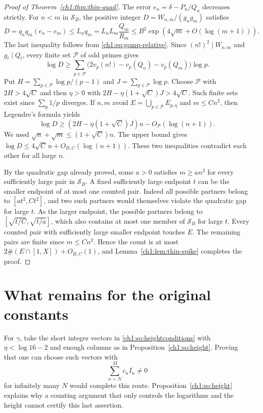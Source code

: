 \documentclass[11pt,a4paper,oneside,openany]{report}
\theoremstyle{remark}\newtheorem{remark}[theorem]{Remark}
\numberwithin{equation}{section}
\begin{document}
\begin{proof}[Proof of Theorem~\ref{ch1:thm:thin-quad}]
The error $e_n=\delta-P_n/Q_n$ decreases strictly. For $n<m$ in
$\mathcal S_B$, the positive integer
$D=W_{n,m}/(g_ng_m)$ satisfies
\[
 D=q_nq_m(e_n-e_m)\le L_n q_m
       = L_n L_m\frac{Q_m}{R_m}
       \le B^2\exp(4\sqrt m+O(\log(m+1))).
\]
The last inequality follows from \eqref{ch1:eq:gomp-relative}. Since $(n!)^2\mid W_{n,m}$
and $g_t\mid Q_t$, every finite set $\mathcal P$ of odd primes gives
\[
 \log D\ge
 \sum_{p\in\mathcal P}
    \big(2v_p(n!)-v_p(Q_n)-v_p(Q_m)\big)\log p .
\]
Put $H=\sum_{p\in\mathcal P}\log p/(p-1)$ and
$J=\sum_{p\in\mathcal P}\log p$. Choose $\mathcal P$ with
$2H>4\sqrt C$ and then $\eta>0$ with
$2H-\eta(1+\sqrt C)J>4\sqrt C$. Such finite sets exist since
$\sum_p 1/p$ diverges. If $n,m$ avoid
$E=\bigcup_{p\in\mathcal P} E_{p,\eta}$ and $m\le Cn^2$, then
Legendre's formula yields
\[
 \log D\ge (2H-\eta(1+\sqrt C)J)n-O_{\mathcal P}(\log(n+1)).
\]
We used $\sqrt n+\sqrt m\le(1+\sqrt C)n$.
The upper bound gives $\log D\le4\sqrt C\,n+O_{B,C}(\log(n+1))$.
These two inequalities contradict each other for all large $n$.

By the quadratic gap already proved, some $a>0$ satisfies
$m\ge a n^2$ for every sufficiently large pair in $\mathcal S_B$.
A fixed sufficiently large endpoint $t$ can be the smaller endpoint
of at most one counted pair. Indeed all possible partners belong to
$[at^2,Ct^2]$, and two such partners would themselves violate the
quadratic gap for large $t$. As the larger endpoint, the possible
partners belong to $[\sqrt{t/C},\sqrt{t/a}]$, which also contains at
most one member of $\mathcal S_B$ for large $t$. Every counted pair
with sufficiently large smaller endpoint touches $E$. The remaining
pairs are finite since $m\le Cn^2$. Hence the count is at most
$2\#(E\cap[1,X])+O_{B,C}(1)$, and Lemma~\ref{ch1:lem:thin-spike} completes
the proof.
\end{proof}

\section{What remains for the original constants}
For $\gamma$, take the short integer vectors in \eqref{ch1:so:heightconditions} with $\eta<\log 16-2$ and enough columns as in Proposition~\ref{ch1:so:height}. Proving that one can choose such vectors with
\[
 \sum_{n=N}^{M}c_n I_n\ne0
\]
for infinitely many $N$ would complete this route. Proposition~\ref{ch1:so:height} explains why a counting argument that only controls the logarithms and the height cannot certify this last assertion.
\end{document}
